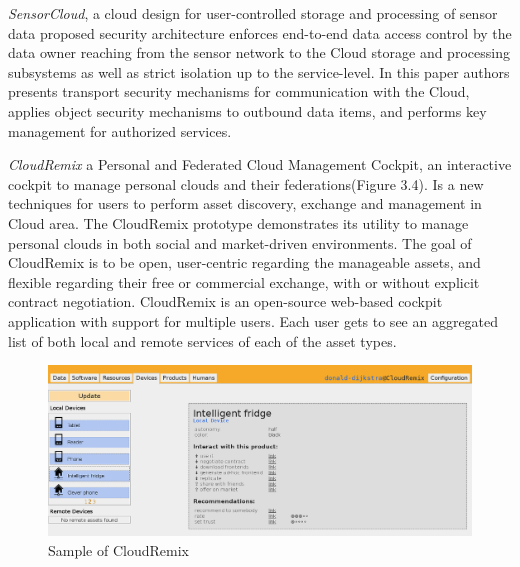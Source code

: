 	\emph{SensorCloud}\cite{hummen2012cloud}, a cloud design for user-controlled storage and processing of sensor data proposed security architecture enforces end-to-end data access control by the data owner reaching from the sensor network to the Cloud storage and processing subsystems as well as strict isolation up to the service-level. In this paper authors presents transport security mechanisms for communication with the Cloud, applies object security mechanisms to outbound data items, and performs key management for authorized services. 

	\emph{CloudRemix\cite{spillner2013personal}} a Personal and Federated Cloud Management Cockpit, an interactive cockpit to manage personal clouds and their federations(Figure 3.4). Is a new techniques for users to perform asset discovery, exchange and management in Cloud area. The CloudRemix prototype demonstrates its utility to manage personal clouds in both social and market-driven environments. The goal of CloudRemix is to be open, user-centric regarding the manageable assets, and flexible regarding their free or commercial exchange, with or without explicit contract negotiation. CloudRemix is an open-source web-based cockpit application with support for multiple users. Each user gets to see an aggregated list of both local and remote services of each of the asset types.
	    \begin{figure}[!ht]
		\centering
		\includegraphics[scale=0.6]{Material/examples/CloudRemix.png}   
		\caption[Sample of CloudRemix]{Sample of CloudRemix}                  
		\end{figure} 

